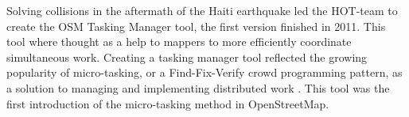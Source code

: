 \documentclass[12pt, a4paper]{report}   	%
\begin{document}
Solving collisions in the aftermath of the Haiti earthquake led the HOT-team to create the OSM Tasking Manager tool, the first version finished in 2011. This tool where thought as a help to mappers to more efficiently coordinate simultaneous work. Creating a tasking manager tool reflected the growing popularity of micro-tasking, or a Find-Fix-Verify crowd programming pattern, as a solution to managing and implementing distributed work \cite{Bernstein2015}. This tool was the first introduction of the micro-tasking method in OpenStreetMap. 

%
%






%



	
%





 
 
\end{document}
